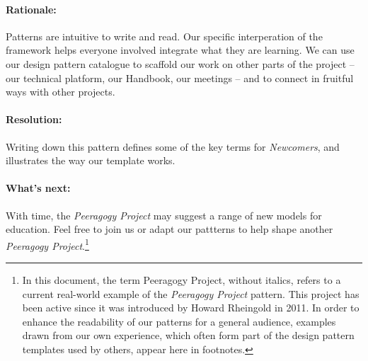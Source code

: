 \paragraph{Rationale:}
Patterns are intuitive to write and read.  Our specific interperation of the framework helps everyone involved integrate what they are learning.  We can use our design pattern catalogue to scaffold our work on other parts of the project -- our technical platform, our Handbook, our meetings -- and to connect in fruitful ways with other projects.  

\paragraph{Resolution:}  
Writing down this pattern defines some of the key terms for \emph{Newcomers}, and illustrates the way our template works. 

\paragraph{What's next:} 
With time, the \emph{Peeragogy Project} may suggest a range of new models for education.  Feel free to join us or adapt our pattterns to help shape another \emph{Peeragogy Project}.\footnote{In this document, the term Peeragogy Project, without italics, refers to a current real-world example of the \emph{Peeragogy Project} pattern.   This project has been active since it was introduced by Howard Rheingold in 2011.  In order to enhance the readability of our patterns for a general audience, examples drawn from our own experience, which often form part of the design pattern templates used by others, appear here in footnotes.}